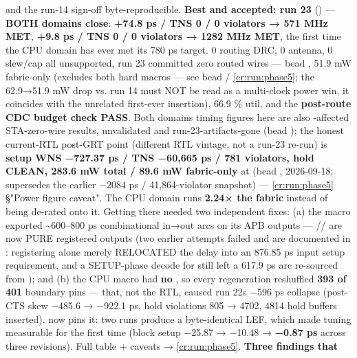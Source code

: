 \begin{record}
\begin{enumerate}
   and the run-14 sign-off byte-reproducible.
  \textbf{Best and accepted: run 23} ()
  --- \textbf{BOTH domains close}:  \textbf{+74.8 ps / TNS
  0 / 0 violators → 571 MHz MET},  \textbf{+9.8 ps / TNS 0
  / 0 violators → 1282 MHz MET}, the first time the CPU domain has ever
  met its 780 ps target. 0 routing DRC, 0 antenna, 0 slew/cap \warn{}
  all unsupported, run 23 committed zero routed wires --- bead
  , 51.9 mW \warn{} fabric-only (excludes both hard macros ---
  see bead  / \cref{cr:run:phase5}; the 62.9→51.9
  mW drop vs. run 14 must NOT be read as a multi-clock power win, it
  coincides with the unrelated first-ever 
  insertion), 66.9 \% util, and the \textbf{post-route CDC budget check
  PASS}. \warn{} Both domains\textquotesingle{} timing figures here are
  also -affected STA-zero-wire results, unvalidated and
  run-23-artifacts-gone (bead ); the honest current-RTL
  post-GRT point (different RTL vintage, not a run-23 re-run) is
  \textbf{setup WNS −727.37 ps / TNS −60,665 ps / 781 violators, hold
  CLEAN, 283.6 mW total / 89.6 mW fabric-only} at
   (bead , 2026-09-18;
  supersedes the earlier −2084 ps / 41,864-violator 
  snapshot) --- \cref{cr:run:phase5} §"Power figure caveat".
  The CPU domain runs \textbf{2.24× the fabric} instead of being
  de-rated onto it. Getting there needed two independent fixes: (a) the
  macro exported \textasciitilde600--800 ps combinational in→out arcs on
  its APB outputs ---
  // are now
  PURE registered outputs (two earlier attempts failed and are
  documented in : registering  alone
  merely RELOCATED the delay into an 876.85 ps input setup requirement,
  and a SETUP-phase decode for  still left a 617.9 ps arc
  re-sourced from ); and (b) the CPU macro had
  \textbf{no }, so every regeneration reshuffled
  \textbf{393 of 401} boundary pins --- that, not the RTL, caused run
  22\textquotesingle s −596 ps collapse (post-CTS  skew
  −485.6 → −922.1 ps, hold violations 805 → 4702, 4814 hold buffers
  inserted).  now pins it: two runs
  produce a byte-identical LEF, which made tuning measurable for the
  first time (block setup −25.87 → −10.48 → \textbf{−0.87 ps} across
  three revisions). Full table + caveats →
  \cref{cr:run:phase5}. \warn{} \textbf{Three findings that
}
\end{enumerate}
\end{record}
